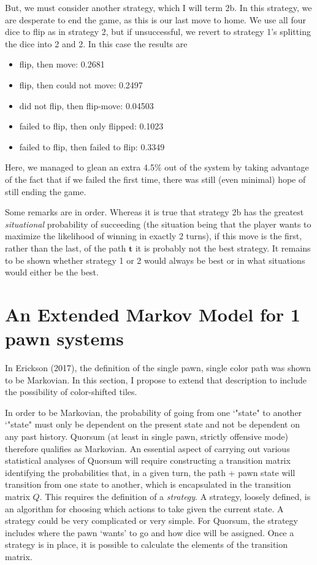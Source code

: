 \documentclass[letterpaper]{article}
\begin{document}
\begin{enumerate}
But, we must consider another strategy, which I will term 2b.  In this strategy,
we are desperate to end the game, as this is our last move to home.  We use
all four dice to flip as in strategy 2, but if unsuccessful, we revert to
strategy 1's splitting the dice into 2 and 2.  In this case the results are
\begin{itemize}
\item flip, then move: 0.2681
\item flip, then could not move: 0.2497
\item did not flip, then flip-move: 0.04503
\item failed to flip, then only flipped: 0.1023
\item failed to flip, then failed to flip: 0.3349
\end{itemize}
Here, we managed to glean an extra 4.5\% out of the system by taking advantage
of the fact that if we failed the first time, there was still (even minimal)
hope of still ending the game.

Some remarks are in order.  Whereas it is true that strategy 2b has the greatest
\textit{situational} probability of succeeding (the situation being that the 
player wants to maximize the likelihood of winning in exactly 2 turns), if this
move is the first, rather than the last, of the path $\mathbf{t}$ it is probably
not the best strategy.  It remains to be shown whether strategy 1 or 2 would 
always be best or in what situations would either be the best.

\section{An Extended Markov Model for 1 pawn systems}
In Erickson (2017), the definition of the single pawn, single color path was
shown to be Markovian.  In this section, I propose to extend that description
to include the possibility of color-shifted tiles.

In order to be Markovian, the probability of going from one `"state" to another
`"state" must only be dependent on the present state and not be dependent on
any past history.  Quorsum (at least in single pawn, strictly offensive mode)
therefore qualifies as Markovian.  An essential aspect of carrying out various
statistical analyses of Quorsum will require constructing a transition matrix
identifying the probabilities that, in a given turn, the path + pawn state will
transition from one state to another, which is encapsulated in the transition
matrix $Q$.  This requires the definition of a \textit{strategy}.  A strategy,
loosely defined, is an algorithm for choosing which actions to take given the 
current state.  A strategy could be very complicated or very simple.  For
Quorsum, the strategy includes where the pawn `wants' to go and how dice will
be assigned.  Once a strategy is in place, it is possible to calculate the
elements of the transition matrix.  


\end{enumerate}
\end{document}
